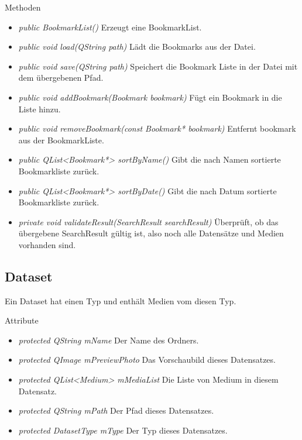 Methoden
\begin{itemize}
\item \textit{public BookmarkList()} Erzeugt eine BookmarkList.
\item \textit{public void load(QString path)} Lädt die Bookmarks aus der Datei.
\item \textit{public void save(QString path)} Speichert die Bookmark Liste in der Datei mit dem übergebenen Pfad.
\item \textit{public void addBookmark(Bookmark bookmark)} Fügt ein Bookmark in die Liste hinzu.
\item \textit{public void removeBookmark(const Bookmark* bookmark)} Entfernt bookmark aus der BookmarkListe.
\item \textit{public QList<Bookmark*> sortByName()} Gibt die nach Namen sortierte Bookmarkliste zurück.
\item \textit{public QList<Bookmark*> sortByDate()} Gibt die nach Datum sortierte Bookmarkliste zurück.
\item \textit{private void validateResult(SearchResult searchResult)} Überprüft, ob das übergebene SearchResult gültig ist, also noch alle Datensätze und Medien vorhanden sind.
\end{itemize}

\subsection*{Dataset}
Ein Dataset hat einen Typ und enthält Medien vom diesen Typ.

Attribute
\begin{itemize}
\item\textit{protected QString mName} Der Name des Ordners.
\item\textit{protected QImage mPreviewPhoto} Das Vorschaubild dieses Datensatzes.
\item\textit{protected QList<Medium> mMediaList} Die Liste von Medium in diesem Datensatz.
\item\textit{protected QString mPath} Der Pfad dieses Datensatzes.
\item\textit{protected DatasetType mType} Der Typ dieses Datensatzes.
\end{itemize}


